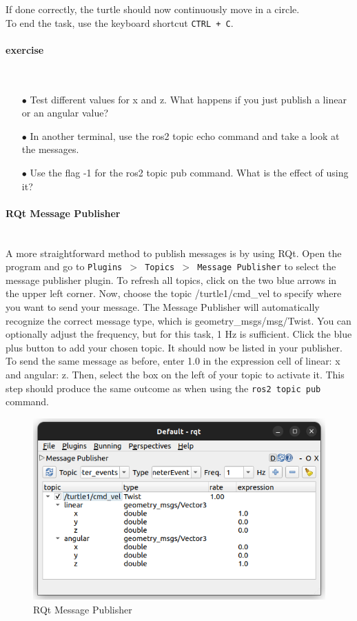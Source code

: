 \documentclass{article}
\begin{document}
\noindent 
If done correctly, the turtle should now continuously move in a circle.\\
To end the task, use the keyboard shortcut \texttt{CTRL + C}. \\

\paragraph{exercise}~\\
\begin{enumerate}
    \item[$\bullet$] Test different values for x and z. What happens if you just publish a linear or an angular value?
    \item[$\bullet$] In another terminal, use the ros2 topic echo command and take a look at the messages.
    \item[$\bullet$] Use the flag -1 for the ros2 topic pub command. What is the effect of using it?
\end{enumerate}

\paragraph{RQt Message Publisher}~\\
A more straightforward method to publish messages is by using RQt. Open the program and go to \texttt{Plugins $>$ Topics $>$ Message Publisher} to select the message publisher plugin. To refresh all topics, click on the two blue arrows in the upper left corner. Now, choose the topic /turtle1/cmd\_vel to specify where you want to send your message. The Message Publisher will automatically recognize the correct message type, which is geometry\_msgs/msg/Twist. You can optionally adjust the frequency, but for this task, 1 Hz is sufficient. Click the blue plus button to add your chosen topic. It should now be listed in your publisher.
To send the same message as before, enter 1.0 in the expression cell of linear: x and angular: z. Then, select the box on the left of your topic to activate it. This step should produce the same outcome as when using the \texttt{ros2 topic pub} command.

\begin{figure}[H]
    \includegraphics[width=  \textwidth]{img/Ros2Basics/RQt_message_publisher.png}
    \caption{RQt Message Publisher}
    \label{figure:message_publisher}
\end{figure}
\end{document}
